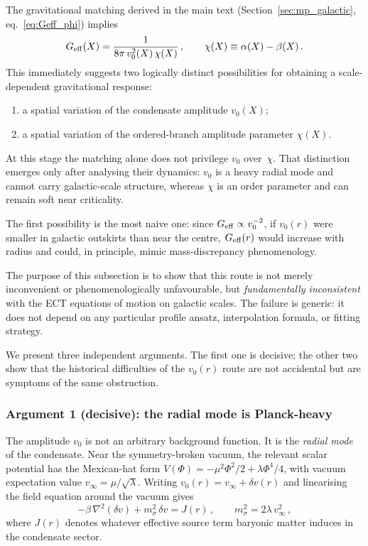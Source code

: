 \documentclass[11pt,a4paper]{article}
\numberwithin{equation}{section}
\begin{document}
The gravitational matching derived in the main text
(Section~\ref{sec:mp_galactic},
eq.~\eqref{eq:Geff_phi}) implies
\begin{equation}
G_{\rm eff}(X) = \frac{1}{8\pi\,v_0^2(X)\,\chi(X)}\,,
\qquad
\chi(X) \equiv \alpha(X) - \beta(X)\,.
\label{eq:app_Geff_v0}
\end{equation}
This immediately suggests two logically distinct possibilities
for obtaining a scale-dependent gravitational response:
\begin{enumerate}
\item a spatial variation of the condensate amplitude $v_0(X)$;
\item a spatial variation of the ordered-branch amplitude parameter
  $\chi(X)$.
\end{enumerate}

At this stage the matching alone does not privilege $v_0$
over~$\chi$.
That distinction emerges only after analysing their dynamics:
$v_0$ is a heavy radial mode and cannot carry galactic-scale
structure, whereas $\chi$ is an order parameter and can
remain soft near criticality.

The first possibility is the most naive one: since
$G_{\rm eff} \propto v_0^{-2}$, if $v_0(r)$ were smaller in
galactic outskirts than near the centre, $G_{\rm eff}(r)$
would increase with radius and could, in principle, mimic
mass-discrepancy phenomenology.

The purpose of this subsection is to show that this route is
not merely inconvenient or phenomenologically unfavourable,
but \emph{fundamentally inconsistent} with the ECT equations
of motion on galactic scales.
The failure is generic: it does not depend on any particular
profile ansatz, interpolation formula, or fitting strategy.

We present three independent arguments.
The first one is decisive; the other two show that the
historical difficulties of the $v_0(r)$ route are not
accidental but are symptoms of the same obstruction.

\subsubsection{Argument 1 (decisive): the radial mode is
Planck-heavy}

The amplitude $v_0$ is not an arbitrary background function.
It is the \emph{radial mode} of the condensate.
Near the symmetry-broken vacuum, the relevant scalar potential
has the Mexican-hat form
$V(\Phi) = -\mu^2\Phi^2/2 + \lambda\Phi^4/4$,
with vacuum expectation value
$v_\infty = \mu/\sqrt{\lambda}$.
Writing $v_0(r) = v_\infty + \delta v(r)$ and linearising the
field equation around the vacuum gives
\begin{equation}
-\beta\,\nabla^2(\delta v) + m_\sigma^2\,\delta v = J(r)\,,
\qquad
m_\sigma^2 = 2\lambda\,v_\infty^2\,,
\label{eq:app_yukawa_v0}
\end{equation}
where $J(r)$ denotes whatever effective source term baryonic
matter induces in the condensate sector.
\end{document}
